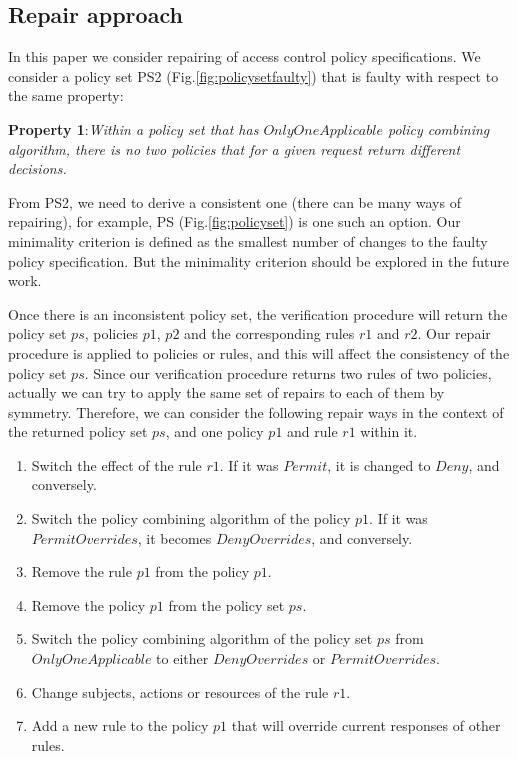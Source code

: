 \documentclass[letterpaper]{acm_proc_article-sp}
\begin{document}
\subsection{Repair approach}

In this paper we consider repairing of access control policy specifications. We consider a policy set PS2 (Fig.\ref{fig:policysetfaulty}) that is faulty with respect to the same property:

\textbf{Property 1}:\textit{Within a policy set that has $OnlyOneApplicable$ policy combining algorithm, there is no two policies that for a given request return different decisions.}

From PS2, we need to derive a consistent one (there can be many ways of repairing), for example, PS (Fig.\ref{fig:policyset}) is one such an option. Our minimality criterion is defined as the smallest number of changes to the faulty policy specification. But the minimality criterion should be explored in the future work.

Once there is an inconsistent policy set, the verification procedure will return the policy set $ps$, policies $p1$, $p2$ and the corresponding rules $r1$ and $r2$. Our repair procedure is applied to policies or rules, and this will affect the consistency of the policy set $ps$. Since our verification procedure returns two rules of two policies, actually we can try to apply the same set of repairs to each of them by symmetry. Therefore, we can consider the following repair ways in the context of the returned policy set $ps$, and one policy $p1$ and rule $r1$ within it.

\begin{enumerate}
\item Switch the effect of the rule $r1$. If it was $Permit$, it is changed to $Deny$, and conversely.
\item Switch the policy combining algorithm of the policy $p1$. If it was $PermitOverrides$, it becomes $DenyOverrides$, and conversely.
\item Remove the rule $p1$ from the policy $p1$.
\item Remove the policy $p1$ from the policy set $ps$.
\item Switch the policy combining algorithm of the policy set $ps$ from $OnlyOneApplicable$ to either $DenyOverrides$ or $PermitOverrides$.
\item Change subjects, actions or resources of the rule $r1$.
\item Add a new rule to the policy $p1$ that will override current responses of other rules.
\end{enumerate}
\end{document}
